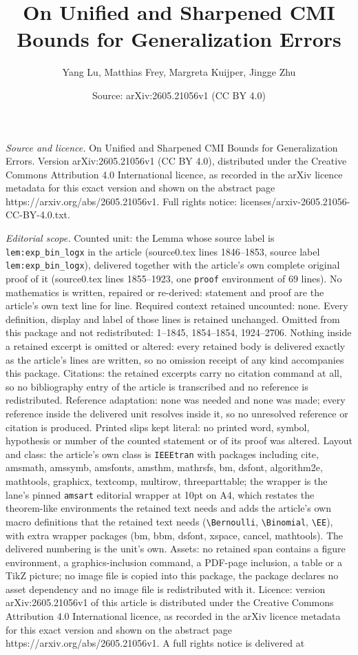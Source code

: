 \documentclass[10pt,a4paper]{amsart}
\title[On Unified and Sharpened CMI Bounds for Generalization Error]{On Unified and Sharpened CMI Bounds for Generalization Errors}
\author{Yang Lu, Matthias Frey, Margreta Kuijper, Jingge Zhu}
\date{Source: arXiv:2605.21056v1 (CC BY 4.0)}
\begin{document}
\maketitle

\noindent\emph{Source and licence.} On Unified and Sharpened CMI Bounds for Generalization Errors. Version arXiv:2605.21056v1 (CC BY 4.0), distributed under the Creative Commons Attribution 4.0 International licence, as recorded in the arXiv licence metadata for this exact version and shown on the abstract page https://arxiv.org/abs/2605.21056v1. Full rights notice: licenses/arxiv-2605.21056-CC-BY-4.0.txt.\par\smallskip

\noindent\textit{Editorial scope.} Counted unit: the Lemma whose source label is \texttt{lem:exp\_bin\_logx} in the article (source0.tex lines 1846--1853, source label \texttt{lem:exp\_bin\_logx}), delivered together with the article's own complete original proof of it (source0.tex lines 1855--1923, one \texttt{proof} environment of 69 lines). No mathematics is written, repaired or re-derived: statement and proof are the article's own text line for line. Required context retained uncounted: none. Every definition, display and label of those lines is retained unchanged. Omitted from this package and not redistributed: 1--1845, 1854--1854, 1924--2706. Nothing inside a retained excerpt is omitted or altered: every retained body is delivered exactly as the article's lines are written, so no omission receipt of any kind accompanies this package. Citations: the retained excerpts carry no citation command at all, so no bibliography entry of the article is transcribed and no reference is redistributed. Reference adaptation: none was needed and none was made; every reference inside the delivered unit resolves inside it, so no unresolved reference or citation is produced. Printed slips kept literal: no printed word, symbol, hypothesis or number of the counted statement or of its proof was altered. Layout and class: the article's own class is \texttt{IEEEtran} with packages including cite, amsmath, amssymb, amsfonts, amsthm, mathrsfs, bm, dsfont, algorithm2e, mathtools, graphicx, textcomp, multirow, threeparttable; the wrapper is the lane's pinned \texttt{amsart} editorial wrapper at 10pt on A4, which restates the theorem-like environments the retained text needs and adds the article's own macro definitions that the retained text needs (\texttt{\textbackslash Bernoulli}, \texttt{\textbackslash Binomial}, \texttt{\textbackslash EE}), with extra wrapper packages (bm, bbm, dsfont, xspace, cancel, mathtools). The delivered numbering is the unit's own. Assets: no retained span contains a figure environment, a graphics-inclusion command, a PDF-page inclusion, a table or a TikZ picture; no image file is copied into this package, the package declares no asset dependency and no image file is redistributed with it. Licence: version arXiv:2605.21056v1 of this article is distributed under the Creative Commons Attribution 4.0 International licence, as recorded in the arXiv licence metadata for this exact version and shown on the abstract page https://arxiv.org/abs/2605.21056v1. A full rights notice is delivered at 
\end{document}
